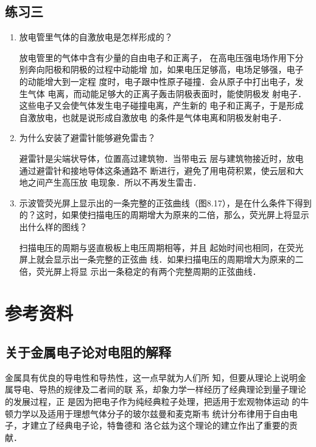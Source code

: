 \subsection{练习三}
\begin{enumerate}
    \item 放电管里气体的自激放电是怎样形成的？

    \begin{solution}
        放电管里的气体中含有少量的自由电子和正离子，
        在高电压强电场作用下分别奔向阳极和阴极的过程中动能增
        加，如果电压足够高，电场足够强，电子的动能增大到一定程
        度时，电子跟中性原子碰撞．会从原子中打出电子，发生气体
        电离，而动能足够大的正离子轰击阴极表面时，能使阴极发
        射电子．这些电子又会使气体发生电子碰撞电离，产生新的
        电子和正离子，于是形成自激放电，也就是说形成自激放电
        的条件是气体电离和阴极发射电子．
    \end{solution}
    
    \item 为什么安装了避雷针能够避免雷击？

    \begin{solution}
        避雷针是尖端状导体，位置高过建筑物．当带电云
        层与建筑物接近时，放电通过避雷针和接地导体这条通路不
        断进行，避免了用电荷积累，使云层和大地之间产生高压放
        电现象．所以不再发生雷击．
    \end{solution}
    
    \item 示波管荧光屏上显示出的一条完整的正弦曲线（图8.17），是在什么条件下得到的？这时，如果使扫描电压的周期增大为原来的二倍，那么，荧光屏上将显示出什么样的图线？

    \begin{solution}
        扫描电压的周期与竖直极板上电压周期相等，并且
        起始时间也相同，在荧光屏上就会显示出一条完整的正弦曲
        线．如果扫描电压的周期增大为原来的二倍，荧光屏上将显
        示出一条稳定的有两个完整周期的正弦曲线．
    \end{solution}
    
\end{enumerate}


\section{参考资料}
\subsection{关于金属电子论对电阻的解释}
金属具有优良的导电性和导热性，这一点早就为人们所
知，但要从理论上说明金属导电、导热的规律及二者间的联
系，却象力学一样经历了经典理论到量子理论的发展过程，正
是因为把电子作为纯经典粒子处理，把适用于宏观物体运动
的牛顿力学以及适用于理想气体分子的玻尔兹曼和麦克斯韦
统计分布律用于自由电子，才建立了经典电子论，特鲁德和
洛仑兹为这个理论的建立作出了重要的贡献．

